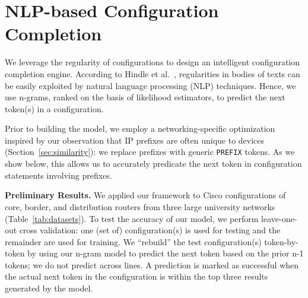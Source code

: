 \section{NLP-based Configuration Completion}

We leverage the regularity of configurations to design an intelligent
configuration completion engine.
According to Hindle et al.~\cite{naturalness}, regularities in bodies of texts
can be easily exploited by natural language processing (NLP) techniques.
Hence, we use n-grams, ranked on the basis of likelihood estimators, to predict
the next token(s) in a configuration.

Prior to building the model, we employ a networking-specific optimization
inspired by our observation that IP prefixes are often unique to devices
(Section~\ref{sec:similarity}): we replace prefixes with generic {\tt PREFIX}
tokens. As we show below, this allows us to accurately
predicate the next token in configuration statements involving prefixes.



{\bf Preliminary Results.} We applied our framework to Cisco configurations of
core, border, and distribution routers from three large university networks
(Table~\ref{tab:datasets}). To test the accuracy of our model, we perform
leave-one-out cross validation: one (set of) configuration(s) is used for
testing and the remainder are used for training. We ``rebuild'' the test
configuration(s) token-by-token by using our n-gram model to predict the next
token based on the  prior n-1 tokens; we do not predict across lines. A
prediction is marked as successful when the actual next token in the
configuration is within the top three results generated by the model. 

